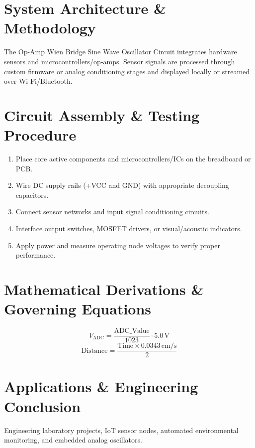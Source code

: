\documentclass[11pt,a4paper]{article}
\begin{document}
\section{System Architecture \& Methodology}
The Op-Amp Wien Bridge Sine Wave Oscillator Circuit integrates hardware sensors and microcontrollers/op-amps. Sensor signals are processed through custom firmware or analog conditioning stages and displayed locally or streamed over Wi-Fi/Bluetooth.

\section{Circuit Assembly \& Testing Procedure}
\begin{enumerate}
    \item Place core active components and microcontrollers/ICs on the breadboard or PCB.
    \item Wire DC supply rails (+VCC and GND) with appropriate decoupling capacitors.
    \item Connect sensor networks and input signal conditioning circuits.
    \item Interface output switches, MOSFET drivers, or visual/acoustic indicators.
    \item Apply power and measure operating node voltages to verify proper performance.
\end{enumerate}

\section{Mathematical Derivations \& Governing Equations}
\begin{equation}
V_{\text{ADC}} = \frac{\text{ADC\_Value}}{1023} \cdot 5.0\,\text{V}
\end{equation}
\begin{equation}
\text{Distance} = \frac{\text{Time} \times 0.0343\,\text{cm/s}}{2}
\end{equation}

\section{Applications \& Engineering Conclusion}
Engineering laboratory projects, IoT sensor nodes, automated environmental monitoring, and embedded analog oscillators.
\end{document}
